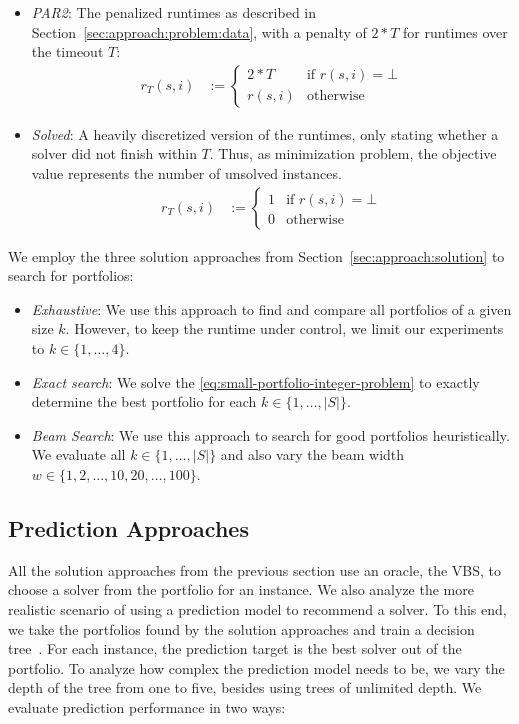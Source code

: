 \documentclass[conference]{IEEEtran}
\begin{document}
\begin{itemize}
	\item \emph{PAR2}:
	The penalized runtimes as described in Section~\ref{sec:approach:problem:data}, with a penalty of $2*T$ for runtimes over the timeout $T$:
	\begin{align*}
		r_T(s,i) &:= \begin{cases}
			2*T & \text{if }r(s,i) = \bot\\
			r(s,i) & \text{otherwise}
		\end{cases}
	\end{align*}
	\item \emph{Solved}:
	A heavily discretized version of the runtimes, only stating whether a solver did not finish within $T$.
	Thus, as minimization problem, the objective value represents the number of unsolved instances.
	\begin{align*}
		r_T(s,i) &:= \begin{cases}
			1 & \text{if }r(s,i) = \bot\\
			0 & \text{otherwise}
		\end{cases}
	\end{align*}
\end{itemize}

We employ the three solution approaches from Section~\ref{sec:approach:solution} to search for portfolios:

\begin{itemize}
	\item \emph{Exhaustive}:
	We use this approach to find and compare all portfolios of a given size $k$.
	However, to keep the runtime under control, we limit our experiments to $k \in \{1, \dots, 4\}$.
	\item \emph{Exact search}:
	We solve the \ref{eq:small-portfolio-integer-problem} to exactly determine the best portfolio for each $k \in \{1, \dots, |S|\}$.
	\item \emph{Beam Search}:
	We use this approach to search for good portfolios heuristically.
	We evaluate all $k \in \{1, \dots, |S|\}$ and also vary the beam width $w \in \{1, 2, \dots, 10, 20, \dots, 100\}$.
\end{itemize}

\subsection{Prediction Approaches}

All the solution approaches from the previous section use an oracle, the VBS, to choose a solver from the portfolio for an instance.
We also analyze the more realistic scenario of using a prediction model to recommend a solver.
To this end, we take the portfolios found by the solution approaches and train a decision tree~\cite{breiman1984classification}.
For each instance, the prediction target is the best solver out of the portfolio.
To analyze how complex the prediction model needs to be, we vary the depth of the tree from one to five, besides using trees of unlimited depth.
We evaluate prediction performance in two ways:
\end{document}

